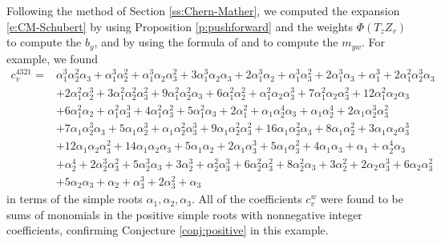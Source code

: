 \documentclass[11pt,letterpaper,reqno]{amsart}
\numberwithin{equation}{section}
\theoremstyle{plain}
\theoremstyle{definition}
\theoremstyle{remark}
\begin{document}
Following the method of Section \ref{ss:Chern-Mather}, we computed the expansion \eqref{e:CM-Schubert}
by using Proposition \ref{p:pushforward} and the weights 
$\Phi(T_z Z_v)$ to compute the $b_y$, and by using the formula of \cite{AJS94} and \cite{Billey99}
to compute
the  \(m_{yw}\).
For example, we found
\begin{equation}
\begin{split}
c_v^{4321}=&\alpha_{1}^{3} \alpha_{2}^{2} \alpha_{3} + \alpha_{1}^{3} \alpha_{2}^{2} + \alpha_{1}^{3} \alpha_{2} \alpha_{3}^{2} + 3 \alpha_{1}^{3} \alpha_{2} \alpha_{3} + 2 \alpha_{1}^{3} \alpha_{2} + \alpha_{1}^{3} \alpha_{3}^{2} + 2 \alpha_{1}^{3} \alpha_{3} + \alpha_{1}^{3} + 2 \alpha_{1}^{2} \alpha_{2}^{3} \alpha_{3} \\& + 2 \alpha_{1}^{2} \alpha_{2}^{3} + 3 \alpha_{1}^{2} \alpha_{2}^{2} \alpha_{3}^{2} + 9 \alpha_{1}^{2} \alpha_{2}^{2} \alpha_{3} + 6 \alpha_{1}^{2} \alpha_{2}^{2} + \alpha_{1}^{2} \alpha_{2} \alpha_{3}^{3} + 7 \alpha_{1}^{2} \alpha_{2} \alpha_{3}^{2} + 12 \alpha_{1}^{2} \alpha_{2} \alpha_{3} \\& + 6 \alpha_{1}^{2} \alpha_{2} + \alpha_{1}^{2} \alpha_{3}^{3} + 4 \alpha_{1}^{2} \alpha_{3}^{2} + 5 \alpha_{1}^{2} \alpha_{3} + 2 \alpha_{1}^{2} + \alpha_{1} \alpha_{2}^{4} \alpha_{3} + \alpha_{1} \alpha_{2}^{4} + 2 \alpha_{1} \alpha_{2}^{3} \alpha_{3}^{2} \\& + 7 \alpha_{1} \alpha_{2}^{3} \alpha_{3} + 5 \alpha_{1} \alpha_{2}^{3} + \alpha_{1} \alpha_{2}^{2} \alpha_{3}^{3} + 9 \alpha_{1} \alpha_{2}^{2} \alpha_{3}^{2} + 16 \alpha_{1} \alpha_{2}^{2} \alpha_{3} + 8 \alpha_{1} \alpha_{2}^{2} + 3 \alpha_{1} \alpha_{2} \alpha_{3}^{3} \\& + 12 \alpha_{1} \alpha_{2} \alpha_{3}^{2} + 14 \alpha_{1} \alpha_{2} \alpha_{3} + 5 \alpha_{1} \alpha_{2} + 2 \alpha_{1} \alpha_{3}^{3} + 5 \alpha_{1} \alpha_{3}^{2} + 4 \alpha_{1} \alpha_{3} + \alpha_{1} + \alpha_{2}^{4} \alpha_{3} \\& + \alpha_{2}^{4} + 2 \alpha_{2}^{3} \alpha_{3}^{2} + 5 \alpha_{2}^{3} \alpha_{3} + 3 \alpha_{2}^{3} + \alpha_{2}^{2} \alpha_{3}^{3} + 6 \alpha_{2}^{2} \alpha_{3}^{2} + 8 \alpha_{2}^{2} \alpha_{3} + 3 \alpha_{2}^{2} + 2 \alpha_{2} \alpha_{3}^{3} + 6 \alpha_{2} \alpha_{3}^{2} \\& + 5 \alpha_{2} \alpha_{3} + \alpha_{2} + \alpha_{3}^{3} + 2 \alpha_{3}^{2} + \alpha_{3}
\end{split}
\end{equation}
in terms of the simple roots \(\alpha_1, \alpha_2, \alpha_3\).
All of the coefficients \(c_v^w\) were found to be sums of monomials in the positive simple roots with nonnegative integer
coefficients, confirming Conjecture \ref{conj:positive} in this example.
\end{document}
